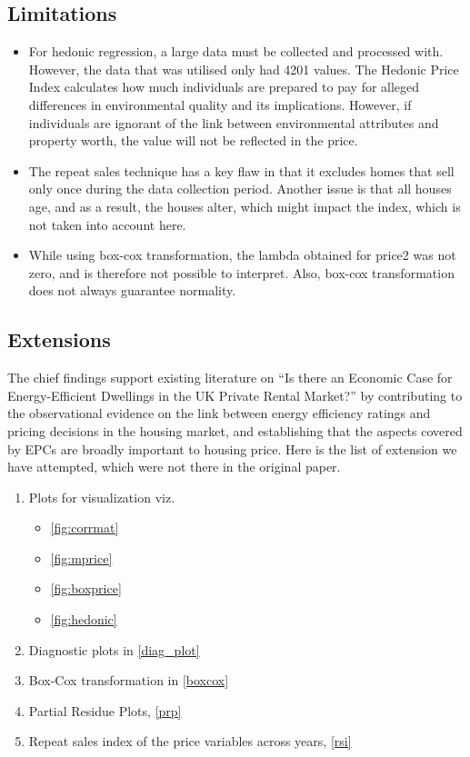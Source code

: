 \documentclass[12pt]{article}
\begin{document}
\subsection{Limitations}
\begin{itemize}
    \item For hedonic regression, a large  data must be collected and processed with. However, the data that was utilised only had 4201 values. The Hedonic Price Index calculates how much individuals are prepared to pay for alleged differences in environmental quality and its implications. However, if individuals are ignorant of the link between environmental attributes and property worth, the value will not be reflected in the price. 
    \item The repeat sales technique has a key flaw in that it excludes homes that sell only once during the data collection period. Another issue is that all houses age, and as a result, the houses alter, which might impact the index, which is not taken into account here.
    \item While using box-cox transformation, the lambda obtained for \gls{price2} was not zero, and is therefore not possible to interpret. Also, box-cox transformation does not always guarantee normality.
\end{itemize}
\subsection{Extensions}
The chief findings support existing literature on “Is there an Economic Case for Energy-Efficient Dwellings in the UK Private Rental Market?” by contributing to the observational evidence on the link between energy efficiency ratings and pricing decisions in the housing market, and establishing that the aspects covered by EPCs are broadly important to housing price.
Here is the list of extension we have attempted, which were not there in the original paper.
\begin{enumerate}
    \item Plots for visualization viz.
    \begin{itemize}
        \item \autoref{fig:corrmat}
        \item \autoref{fig:mprice}
        \item \autoref{fig:boxprice}
        \item \autoref{fig:hedonic}
    \end{itemize}
    \item Diagnostic plots in \autoref{diag_plot}
    \item Box-Cox transformation in \autoref{boxcox}
    \item Partial Residue Plots, \autoref{prp}
    \item Repeat sales index of the price variables across years, \autoref{rsi}
\end{enumerate}
\end{document}
